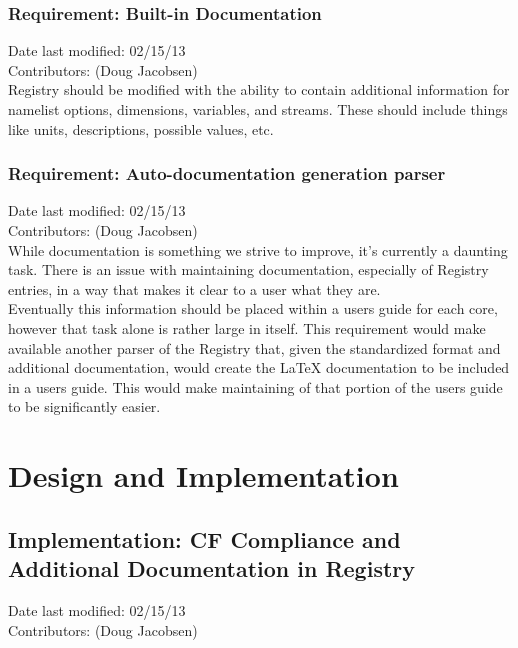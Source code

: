 \documentclass[11pt]{report}
\begin{document}
\subsection{Requirement: Built-in Documentation}
Date last modified: 02/15/13 \\
Contributors: (Doug Jacobsen) \\

Registry should be modified with the ability to contain additional information
for namelist options, dimensions, variables, and streams. These should include
things like units, descriptions, possible values, etc.

\subsection{Requirement: Auto-documentation generation parser}
Date last modified: 02/15/13 \\
Contributors: (Doug Jacobsen) \\

While documentation is something we strive to improve, it's currently a
daunting task. There is an issue with maintaining documentation, especially of
Registry entries, in a way that makes it clear to a user what they are.  \\

Eventually this information should be placed within a users guide for each
core, however that task alone is rather large in itself. This requirement would
make available another parser of the Registry that, given the standardized
format and additional documentation, would create the LaTeX documentation to be
included in a users guide. This would make maintaining of that portion of the
users guide to be significantly easier.\\


\chapter{Design and Implementation}

\section{Implementation: CF Compliance and Additional Documentation in Registry}
Date last modified: 02/15/13 \\
Contributors: (Doug Jacobsen) \\
\end{document}
